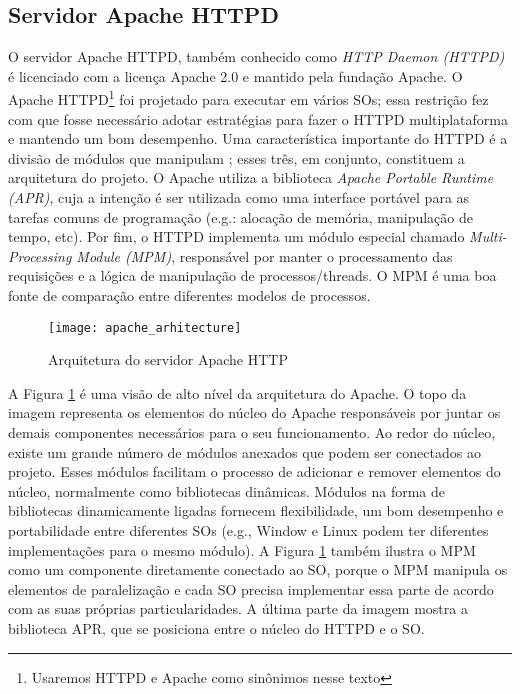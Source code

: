 \subsection{Servidor Apache HTTPD}
\label{sec:architecture}

O servidor Apache HTTPD, também conhecido como \textit{HTTP Daemon (HTTPD)} é
licenciado com a licença Apache 2.0 e mantido pela fundação Apache.  O Apache
HTTPD\footnote{Usaremos HTTPD e Apache como sinônimos nesse texto} foi
projetado para executar em vários SOs; essa restrição fez com que fosse
necessário adotar estratégias para fazer o HTTPD multiplataforma e mantendo um
bom desempenho.  Uma característica importante do HTTPD é a divisão de módulos
que manipulam ; esses
três, em conjunto, constituem a arquitetura do projeto. O Apache utiliza
a biblioteca \textit{Apache Portable Runtime (APR)}, cuja a intenção é ser
utilizada como uma interface portável para as tarefas comuns de programação
(e.g.: alocação de memória, manipulação de tempo, etc). Por fim, o HTTPD
implementa um módulo especial chamado \textit{Multi-Processing Module (MPM)},
responsável por manter o processamento das requisições e a lógica de
manipulação de processos/threads. O MPM é uma boa fonte de comparação entre
diferentes modelos de processos.

\begin{figure}[!h]
  \centering
  \texttt{[image: apache\_arhitecture]} 
	\caption[Arquitetura do servidor Apache HTTP]{Arquitetura do servidor Apache HTTP \citep{apache_module_book}}
  \label{fig:apache_architecture} 
\end{figure}

A Figura \ref{fig:apache_architecture} é uma visão de alto nível da arquitetura
do Apache. O topo da imagem representa os elementos do núcleo do Apache
responsáveis por juntar os demais componentes necessários para o seu
funcionamento. Ao redor do núcleo, existe um grande número de módulos anexados
que podem ser conectados ao projeto. Esses módulos facilitam o processo de
adicionar e remover elementos do núcleo, normalmente como bibliotecas
dinâmicas. Módulos na forma de bibliotecas dinamicamente ligadas fornecem
flexibilidade, um bom desempenho e portabilidade entre diferentes SOs (e.g.,
Window e Linux podem ter diferentes implementações para o mesmo módulo). A
Figura \ref{fig:apache_architecture} também ilustra o MPM como um componente
diretamente conectado ao SO, porque o MPM manipula os elementos de
paralelização e cada SO precisa implementar essa parte de acordo com as suas
próprias particularidades. A última parte da imagem mostra a biblioteca APR,
que se posiciona entre o núcleo do HTTPD e o SO.

